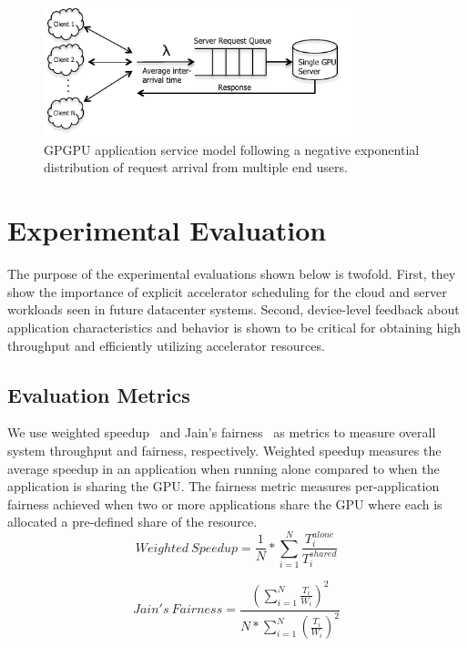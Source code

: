 \begin{figure}[t]
\centering
\includegraphics[width=0.80\textwidth,height=\textheight,keepaspectratio]{figures/servicemodel.pdf}
\caption{GPGPU application service model following a negative exponential distribution of request arrival from multiple end users.}
\label{fig:servicemodel}
\end{figure}
\section{Experimental Evaluation}
The purpose of the experimental evaluations shown below is twofold. First, they show the importance of explicit accelerator scheduling for the cloud and server workloads seen in future datacenter systems. Second, device-level feedback about application characteristics and behavior is shown to be critical for obtaining high throughput and efficiently utilizing accelerator resources.
\subsection{Evaluation Metrics}
We use weighted speedup~\cite{dean} and Jain's fairness~\cite{jain} as metrics to measure overall system throughput and fairness, respectively. Weighted speedup measures the average speedup in an application when running alone compared to when the application  is sharing the GPU. The  fairness  metric  measures per-application fairness achieved when two or more applications share the GPU where each is allocated a pre-defined share of the resource.
\begin{equation}
Weighted\  Speedup = \frac{1}{N}*\sum_{i=1}^{N}\frac{T_i^{alone}}{T_i^{shared}} 
\end{equation}

\begin{equation}
Jain's\ Fairness = \frac{(\sum_{i=1}^N\frac{T_i}{W_i})^2}{N*\sum_{i=1}^N(\frac{T_i}{W_i})^2}
\end{equation}
